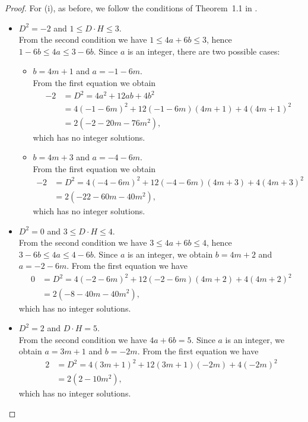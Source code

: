 \documentclass[12pt,reqno]{amsart}
\theoremstyle{plain}
\theoremstyle{definition}
\theoremstyle{remark}
\theoremstyle{definition}
\begin{document}
\begin{proof}
For (i), as before, we follow the conditions of Theorem~1.1 in \cite{kwa}.
\begin{itemize}
    \item $D^{2} = -2$ and $1 \leq D \cdot H \leq 3$.\\
    From the second condition we have $1 \leq 4a + 6b \leq 3$, hence $1 - 6b \leq 4a \leq 3 - 6b$. Since $a$ is an integer, there are two possible cases:
    \begin{itemize}
        \item[*] $b = 4m + 1$ and $a = -1 - 6m$.\\
        From the first equation we obtain
        \begin{align*}
            -2 &= D^{2} = 4a^{2} + 12ab + 4b^{2} \\
               &= 4(-1-6m)^{2} + 12(-1-6m)(4m+1) + 4(4m+1)^{2} \\
               &= 2(-2 - 20m - 76m^{2}),
        \end{align*}
        which has no integer solutions.

        \item[*] $b = 4m + 3$ and $a = -4 - 6m$.\\
        From the first equation we obtain
        \begin{align*}
            -2 &= D^{2} = 4(-4-6m)^{2} + 12(-4-6m)(4m+3) + 4(4m+3)^{2} \\
               &= 2(-22 - 60m - 40m^{2}),
        \end{align*}
        which has no integer solutions.
    \end{itemize}

    \item $D^{2} = 0$ and $3 \leq D \cdot H \leq 4$.\\
    From the second condition we have $3 \leq 4a + 6b \leq 4$, hence $3 - 6b \leq 4a \leq 4 - 6b$. Since $a$ is an integer, we obtain $b = 4m + 2$ and $a = -2 - 6m$. From the first equation we have
    \begin{align*}
        0 &= D^{2} = 4(-2-6m)^{2} + 12(-2-6m)(4m+2) + 4(4m+2)^{2} \\
          &= 2(-8 - 40m - 40m^{2}),
    \end{align*}
    which has no integer solutions.

    \item $D^{2} = 2$ and $D \cdot H = 5$.\\
    From the second condition we have $4a + 6b = 5$. Since $a$ is an integer, we obtain $a = 3m + 1$ and $b = -2m$. From the first equation we have
    \begin{align*}
        2 &= D^{2} = 4(3m+1)^{2} + 12(3m+1)(-2m) + 4(-2m)^{2} \\
          &= 2(2 - 10m^{2}),
    \end{align*}
    which has no integer solutions.


\end{itemize}
\end{proof}
\end{document}
